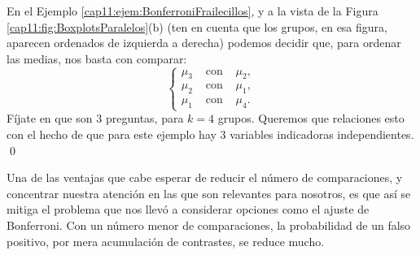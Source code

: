 \begin{ejemplo}
\label{cap11:ejem:SeleccionandoContrastesParaContrastes}
En el Ejemplo \ref{cap11:ejem:BonferroniFrailecillos}, y a la vista de la Figura \ref{cap11:fig:BoxplotsParalelos}(b) (ten en cuenta que los grupos, en esa figura, aparecen ordenados de izquierda a derecha)
podemos decidir que, para ordenar las medias, nos basta con comparar:
\[
\left\{
\begin{array}{lcl}
\mu_3&\mbox{ con }&\mu_2,\\
\mu_2&\mbox{ con }&\mu_1,\\
\mu_1&\mbox{ con }&\mu_4.
\end{array}\right.
\]
Fíjate en que son $3$ preguntas, para $k=4$ grupos. Queremos que relaciones esto con el hecho de que para este ejemplo hay $3$ variables indicadoras independientes.
%
\qed
\end{ejemplo}
Una de las ventajas que cabe esperar de reducir el número de comparaciones, y concentrar nuestra atención en las que son relevantes para nosotros, es que así se mitiga el problema que nos llevó a considerar opciones como el ajuste de Bonferroni. Con un número menor de comparaciones, la probabilidad de un falso positivo, por mera acumulación de contrastes, se reduce mucho.

